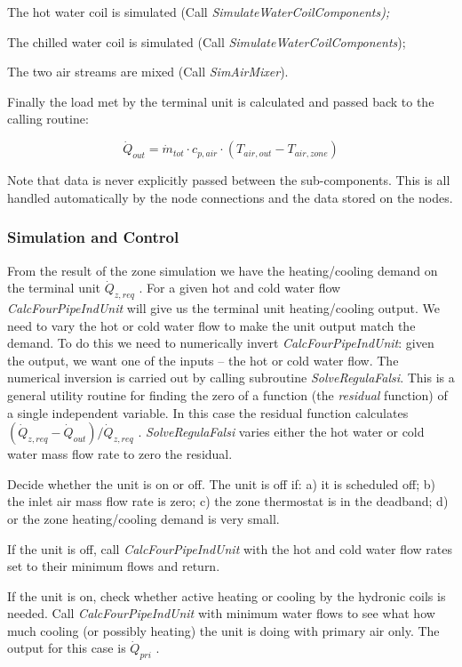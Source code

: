 The hot water coil is simulated (Call \emph{SimulateWaterCoilComponents);}

The chilled water coil is simulated (Call \emph{SimulateWaterCoilComponents});

The two air streams are mixed (Call \emph{SimAirMixer}).

Finally the load met by the terminal unit is calculated and passed back to the calling routine:

\begin{equation}
{\dot Q_{out}} = {\dot m_{tot}}\cdot {c_{p,air}}\cdot ({T_{air,out}} - {T_{air,zone}})
\end{equation}

Note that data is never explicitly passed between the sub-components. This is all handled automatically by the node connections and the data stored on the nodes.

\subsubsection{Simulation and Control}\label{simulation-and-control-1}

From the result of the zone simulation we have the heating/cooling demand on the terminal unit \({\dot Q_{z,req}}\) . For a given hot and cold water flow \emph{CalcFourPipeIndUnit} will give us the terminal unit heating/cooling output. We need to vary the hot or cold water flow to make the unit output match the demand. To do this we need to numerically invert \emph{CalcFourPipeIndUnit}: given the output, we want one of the inputs -- the hot or cold water flow. The numerical inversion is carried out by calling subroutine \emph{SolveRegulaFalsi}. This is a general utility routine for finding the zero of a function (the \emph{residual} function) of a single independent variable. In this case the residual function calculates \(({\dot Q_{z,req}} - {\dot Q_{out}})/{\dot Q_{z,req}}\) . \emph{SolveRegulaFalsi} varies either the hot water or cold water mass flow rate to zero the residual.

Decide whether the unit is on or off. The unit is off if: a) it is scheduled off; b) the inlet air mass flow rate is zero; c) the zone thermostat is in the deadband; d) or the zone heating/cooling demand is very small.

If the unit is off, call \emph{CalcFourPipeIndUnit} with the hot and cold water flow rates set to their minimum flows and return.

If the unit is on, check whether active heating or cooling by the hydronic coils is needed. Call \emph{CalcFourPipeIndUnit} with minimum water flows to see what how much cooling (or possibly heating) the unit is doing with primary air only. The output for this case is \({\dot Q_{pri}}\) .

